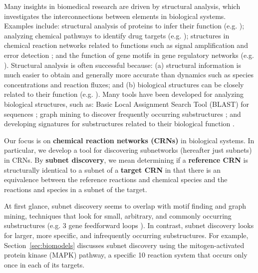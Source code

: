 \documentclass[webpdf,contemporary,large]{oup-authoring-template}
\newcommand{\secref}[1]{Section~\ref{#1}}
\theoremstyle{thmstyleone}%
\theoremstyle{thmstyletwo}%
\theoremstyle{thmstylethree}%
\begin{document}
Many insights in biomedical research are driven by structural analysis, which investigates
the interconnections between elements in biological systems.
Examples include:
structural analysis of proteins to infer their function (e.g. \citep{osadchy_maps_2011}); analyzing chemical pathways to identify drug targets (e.g. \citep{paul_artificial_2021});
structures in chemical reaction networks related to functions such as signal amplification and error detection \citep{hartwell_molecular_1999};
and the function of gene motifs in gene regulatory networks (e.g. \citep{Alon2007}).
Structural analysis is often successful because: (a) structural information is much easier to obtain and generally more accurate than dynamics such as species concentrations and reaction fluxes; and (b)
biological structures can be closely related to their function (e.g. \citep{sharan_modeling_2006}).
Many tools have been developed for analyzing biological structures, such as:
Basic Local Assignment Search Tool (BLAST) for sequences \citep{mcginnis_blast_2004}; graph mining to discover frequently occurring substructures \citep{lambusch_identifying_2018}; and developing signatures for substructures related to their biological function \citep{shellman_network_2013}.

Our focus is on {\bf chemical reaction networks (CRNs)} in biological systems.
In particular, we develop a tool for discovering subnetworks (hereafter just subnets) in CRNs.
By {\bf subnet discovery}, we mean determining if a {\bf reference CRN} is structurally identical to a subnet of a {\bf target CRN} in that there is an equivalence between the reference reactions and chemical species and the reactions and species in a subnet of the target.

At first glance, subnet discovery seems to overlap with motif finding and graph mining, techniques that look for small, arbitrary, and commonly occurring substructures (e.g. 3 gene feedforward loops \citep{Alon2007}).
In contrast,
subnet discovery looks for larger, more specific, and infrequently occurring substructures.
For example, \secref{sec:biomodels} discusses subnet discovery using the mitogen-activated protein kinase (MAPK) pathway, a specific 10 reaction system that occurs only once in each of its targets.
\end{document}
